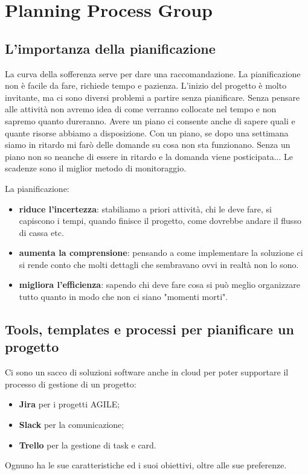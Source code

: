 \section{Planning Process Group}
\subsection{L’importanza della pianificazione}
La curva della sofferenza serve per dare una raccomandazione. La pianificazione non è facile da fare, richiede tempo e pazienza. L'inizio del progetto è molto invitante, ma ci sono diversi problemi a partire senza pianificare. Senza pensare alle attività non avremo idea di come verranno collocate nel tempo e non sapremo quanto dureranno. Avere un piano ci consente anche di sapere quali e quante risorse abbiamo a disposizione.
\noindent Con un piano, se dopo una settimana siamo in ritardo mi farò delle domande su cosa non sta funzionano. Senza un piano non so neanche di essere in ritardo e la domanda viene posticipata...
Le scadenze sono il miglior metodo di monitoraggio.

\noindent La pianificazione:
\begin{itemize}
	\item \textbf{riduce l'incertezza}: stabiliamo a priori attività, chi le deve fare, si capiscono i tempi, quando finisce il progetto, come dovrebbe andare il flusso di cassa etc.
	\item \textbf{aumenta la comprensione}: pensando a come implementare la soluzione ci si rende conto che molti dettagli che sembravano ovvi in realtà non lo sono.
	\item \textbf{migliora l'efficienza}: sapendo chi deve fare cosa si può meglio organizzare tutto quanto in modo che non ci siano "momenti morti".
\end{itemize}

\subsection{Tools, templates e processi per pianificare un progetto}
Ci sono un sacco di soluzioni software anche in cloud per poter supportare il processo di gestione di un progetto:
\begin{itemize}
	\item \textbf{Jira} per i progetti AGILE;
	\item \textbf{Slack} per la comunicazione;
	\item \textbf{Trello} per la gestione di task e card.
\end{itemize}
Ognuno ha le sue caratteristiche ed i suoi obiettivi, oltre alle sue preferenze.
